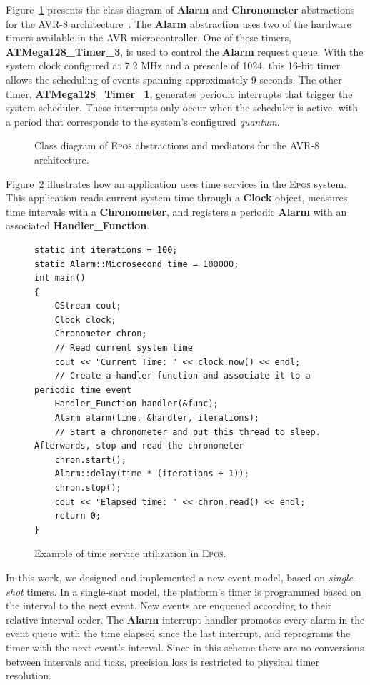 \documentclass[final,3pd,times]{elsarticle}
\newcommand{\fig}[4][tbp]{
  \begin{figure}[#1]
    {\centering{\texttt{[image: \#2]}}\par}
    \caption{#3}
    \label{fig:#2}
  \end{figure}
}
\newcommand{\class}[1]{{\sffamily\bfseries{#1}}}
\begin{document}
Figure~\ref{fig:class_diagram} presents the class diagram of
\class{Alarm} and \class{Chronometer} abstractions for the AVR-8
architecture~\cite{atmega128datasheet}. The \class{Alarm} abstraction
uses two of the hardware timers available in the AVR microcontroller.
One of these timers, \class{ATMega128\_Timer\_3}, is used to control the
\class{Alarm} request queue. With the system clock configured at 7.2 MHz
and a prescale of 1024, this 16-bit timer allows the scheduling of
events spanning approximately 9 seconds.  The other timer,
\class{ATMega128\_Timer\_1}, generates periodic interrupts that trigger
the system scheduler. These interrupts only occur when the scheduler is
active, with a period that corresponds to the system's configured
\emph{quantum}.

\fig[ht]{class_diagram}{Class diagram of \textsc{Epos} abstractions and
  mediators for the AVR-8 architecture.}{scale=.41}

Figure~\ref{prg:time_app} illustrates how an application uses time
services in the \textsc{Epos} system. This application reads current
system time through a \class{Clock} object, measures time intervals with
a \class{Chronometer}, and registers a periodic \class{Alarm} with an
associated \class{Handler\_Function}.

\begin{figure}[ht]
   \lstset{frame=single,language=C++,xleftmargin=2em,style=prg,basicstyle=\scriptsize}
   \begin{lstlisting}
static int iterations = 100;
static Alarm::Microsecond time = 100000;
int main() 
{
    OStream cout;
    Clock clock;
    Chronometer chron;
    // Read current system time
    cout << "Current Time: " << clock.now() << endl;
    // Create a handler function and associate it to a periodic time event
    Handler_Function handler(&func);
    Alarm alarm(time, &handler, iterations);
    // Start a chronometer and put this thread to sleep. Afterwards, stop and read the chronometer
    chron.start();
    Alarm::delay(time * (iterations + 1));
    chron.stop();
    cout << "Elapsed time: " << chron.read() << endl;
    return 0;
}    
   \end{lstlisting}
  \caption{Example of time service utilization in \textsc{Epos}.}
  \label{prg:time_app}
\end{figure}

In this work, we designed and implemented a new event model, based on
\emph{single-shot} timers. In a single-shot model, the platform's timer
is programmed based on the interval to the next event. New events are
enqueued according to their relative interval order.  The \class{Alarm}
interrupt handler promotes every alarm in the event queue with the time
elapsed since the last interrupt, and reprograms the timer with the next
event's interval. Since in this scheme there are no conversions between
intervals and ticks, precision loss is restricted to physical timer
resolution.
\end{document}
